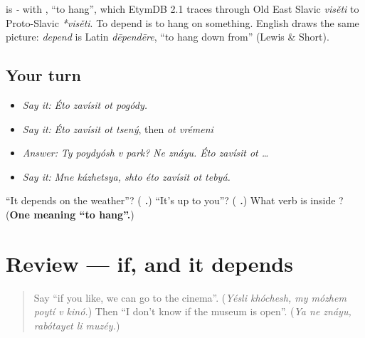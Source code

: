 \begin{cousinweb}
\textbf{} is \emph{-} with \textbf{}, \textquotedblleft{}to hang\textquotedblright{}, which EtymDB 2.1 traces through Old East Slavic \emph{visěti} to Proto-Slavic \emph{*visěti}. To depend is to hang on something. English draws the same picture: \emph{depend} is Latin \emph{dēpendēre}, \textquotedblleft{}to hang down from\textquotedblright{} (Lewis \& Short).
\end{cousinweb}

\subsection*{Your turn}
\begin{itemize}
\raggedright
  \item \emph{Say it:} \emph{Éto zavísit ot pogódy.}
  \item \emph{Say it:} \emph{Éto zavísit ot tsený}, then \emph{ot vrémeni}
  \item \emph{Answer:} \emph{Ty poydyósh v park?} \emph{Ne znáyu. Éto zavísit ot …}
  \item \emph{Say it:} \emph{Mne kázhetsya, shto éto zavísit ot tebyá.}
\end{itemize}

\begin{tcolorbox}[breakable,colback=teal!4,colframe=teal!35!black,title={Before you move on}]
\textquotedblleft{}It depends on the weather\textquotedblright{}? (\emph{\textbf{   .}}) \textquotedblleft{}It's up to you\textquotedblright{}? (\emph{\textbf{   .}}) What verb is inside \emph{}? (\textbf{One meaning \textquotedblleft{}to hang\textquotedblright{}.})
\end{tcolorbox}
\section[(review)]{Review — if, and it depends}

\label{lesson:RU-C269-review}



\begin{quote}
Say \textquotedblleft{}if you like, we can go to the cinema\textquotedblright{}. (\emph{Yésli khóchesh, my mózhem poytí v kinó.}) Then \textquotedblleft{}I don't know if the museum is open\textquotedblright{}. (\emph{Ya ne znáyu, rabótayet li muzéy.})
\end{quote}

